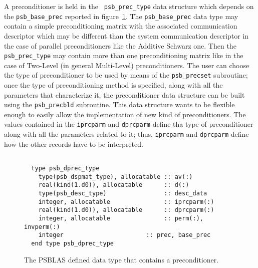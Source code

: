  A preconditioner is held in the \hypertarget{precdata}{{\tt
    psb\_prec\_type}} data structure which depends on the
\verb|psb_base_prec| reported in 
figure~\ref{fig:prectype}. The \verb|psb_base_prec| 
data type may contain a simple preconditioning matrix with the
associated communication descriptor which may be different than the
system communication descriptor in the case of parallel
preconditioners like the Additive Schwarz one. Then the
\verb|psb_prec_type| may contain more than one preconditioning matrix
like in the case of Two-Level (in general Multi-Level) preconditioners.
The user can choose the type of preconditioner to be used by means of
the \verb|psb_precset| subroutine; once the type of preconditioning
method is specified, along with all the parameters that characterize
it, the preconditioner data structure can be built using the
\verb|psb_precbld| subroutine.
This data structure wants to be flexible enough to easily allow the
implementation of new kind of preconditioners. The values contained in
the \verb|iprcparm| and \verb|dprcparm| define tha type of
preconditioner along with all the parameters related to it; thus,
\verb|iprcparm| and \verb|dprcparm| define how the other records have
to be interpreted.
\begin{figure}[h!]
  \small
  \begin{Sbox}
    \begin{minipage}[tl]{0.9\textwidth}
\begin{verbatim}

  type psb_dprec_type
    type(psb_dspmat_type), allocatable :: av(:) 
    real(kind(1.d0)), allocatable      :: d(:)  
    type(psb_desc_type)                :: desc_data 
    integer, allocatable               :: iprcparm(:) 
    real(kind(1.d0)), allocatable      :: dprcparm(:) 
    integer, allocatable               :: perm(:),  invperm(:) 
    integer                       :: prec, base_prec
  end type psb_dprec_type

\end{verbatim}
    \end{minipage}
  \end{Sbox}
  \setlength{\fboxsep}{8pt}
  \begin{center}
    \fbox{\TheSbox}
  \end{center}
  \caption{\label{fig:prectype}The PSBLAS defined data type that contains a preconditioner.}
\end{figure}

